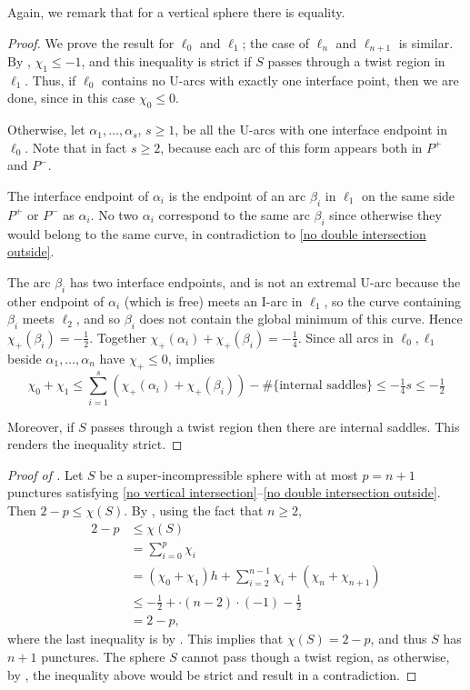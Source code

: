 \documentclass[12pt,reqno]{amsart}
\theoremstyle{plain}
\theoremstyle{definition}
\begin{document}
Again, we remark that for a vertical sphere there is equality.

\begin{proof}
We prove the result for $\ell_0$ and $\ell_1$; the case of $\ell_n$ and 
$\ell_{n+1}$ is similar. By ,  
$\chi_1\le -1$, and this inequality is strict if $S$ passes 
through a twist region in $\ell_1$. Thus, if $\ell_0$ contains no U-arcs 
with exactly one interface point, then we are done, since in this 
case $\chi_0\le 0$.
    
Otherwise, let $\alpha_1,\dots,\alpha_s$, $s\ge 1$, be all the U-arcs 
with one interface endpoint in $\ell_0$. Note that in fact $s\ge 2$, 
because each arc of this form appears both in $P^+$ and $P^-$.
    
The interface endpoint of $\alpha_i$ is the endpoint of an arc 
$\beta_i$ in $\ell_1$ on the same side $P^+$ or $P^-$ as $\alpha_i$. 
No two $\alpha_i$ correspond to the same arc $\beta_i$ since otherwise 
they would belong to the same curve, in contradiction to 
\ref{no double intersection outside}.
    
The arc $\beta_i$ has two interface endpoints, and is not an extremal 
U-arc because the other endpoint of $\alpha_i$ (which is free) meets an I-arc 
in $\ell_1$, so the curve containing $\beta_i$ meets $\ell_2$, and so $\beta_i$ 
does not contain the global minimum of this curve. Hence $\chi_+(\beta_i)= -\tfrac12$.
Together $\chi_+(\alpha_i) + \chi_+(\beta_i)= -\tfrac14$. 
Since all arcs in $\ell_0,\ell_1$ beside $\alpha_1,\dots,\alpha_n$ 
have $\chi_+\le 0$,  implies
$$\chi_0+\chi_1 \le \sum_{i=1}^s(\chi_+(\alpha_i)+\chi_+(\beta_i)) 
- \#\{\text{internal saddles}\} \le -\tfrac14 s \le -\tfrac12$$

Moreover, if $S$ passes through a twist region then there are internal
saddles. This renders the inequality strict. 
\end{proof}

\begin{proof}[Proof of ]
Let $S$ be a super-incompressible sphere with at most $p=n+1$ punctures satisfying 
\ref{no vertical intersection}--\ref{no double intersection outside}.
Then $2-p \leq \chi(S)$. 
By , using the fact that $n\geq 2$, 
\begin{align*}
2-p&\leq \chi(S) \\
&= \sum_{i=0}^{p}\chi_i\\
    &= \left(\chi_0 + \chi_1\right)h + \sum_{i=2}^{n-1} \chi_i + \left(\chi_n + 
    \chi_{n+1}\right) \\
    &\le -\tfrac12 +\cdot (n-2)\cdot (-1) - \tfrac12 
    \\&= 2-p,
\end{align*}
where the last inequality is by . 
This implies that $\chi(S)=2-p$, and thus $S$ has $n+1$ punctures. The sphere $S$ cannot 
pass though a twist region, as otherwise, by , 
the inequality above would be strict and result in a contradiction.
\end{proof}
\end{document}

